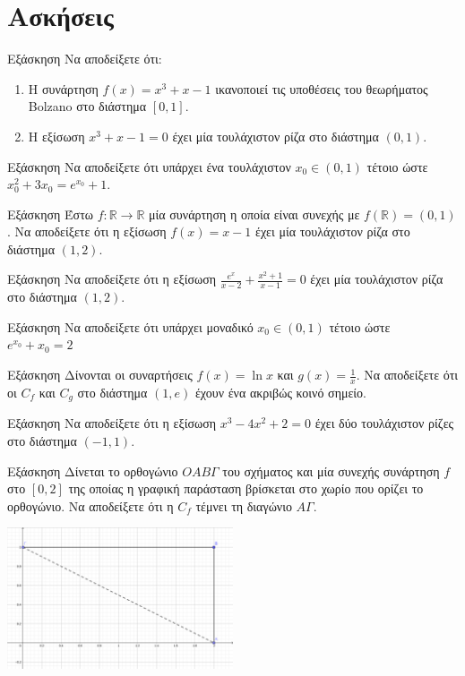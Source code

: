 \documentclass[greek]{beamer}
\begin{document}
\section{Ασκήσεις}
\begin{frame}{Εξάσκηση}
 Να αποδείξετε ότι:
 \begin{enumerate}
  \item Η συνάρτηση $f(x)=x^3+x-1$ ικανοποιεί τις υποθέσεις του θεωρήματος Bolzano στο διάστημα $[0,1]$.\pause
  \item Η εξίσωση $x^3+x-1=0$ έχει μία τουλάχιστον ρίζα στο διάστημα $(0,1)$.
 \end{enumerate}
\end{frame}

\begin{frame}{Εξάσκηση}
 Να αποδείξετε ότι υπάρχει ένα τουλάχιστον $x_0\in (0,1)$ τέτοιο ώστε $x_0^2+3x_0=e^{x_0}+1$.
\end{frame}

\begin{frame}{Εξάσκηση}
 Έστω $f:\mathbb{R}\to\mathbb{R}$ μία συνάρτηση η οποία είναι συνεχής με $f(\mathbb{R})=(0,1)$. Να αποδείξετε ότι η εξίσωση $f(x)=x-1$ έχει μία τουλάχιστον ρίζα στο διάστημα $(1,2)$.
\end{frame}

\begin{frame}{Εξάσκηση}
 Να αποδείξετε ότι η εξίσωση $\frac{e^x}{x-2}+\frac{x^2+1}{x-1}=0$ έχει μία τουλάχιστον ρίζα στο διάστημα $(1,2)$.
\end{frame}

\begin{frame}{Εξάσκηση}
 Να αποδείξετε ότι υπάρχει μοναδικό $x_0\in (0,1)$ τέτοιο ώστε $e^{x_0}+x_0=2$
\end{frame}

\begin{frame}{Εξάσκηση}
 Δίνονται οι συναρτήσεις $f(x)=\ln x$ και $g(x)=\frac{1}{x}$. Να αποδείξετε ότι οι $C_f$ και $C_g$ στο διάστημα $(1,e)$ έχουν ένα ακριβώς κοινό σημείο.
\end{frame}

\begin{frame}{Εξάσκηση}
 Να αποδείξετε ότι η εξίσωση $x^3-4x^2+2=0$ έχει δύο τουλάχιστον ρίζες στο διάστημα $(-1,1)$.
\end{frame}

\begin{frame}{Εξάσκηση}
 Δίνεται το ορθογώνιο $ΟΑΒΓ$ του σχήματος και μία συνεχής συνάρτηση $f$ στο $[0,2]$ της οποίας η γραφική παράσταση βρίσκεται στο χωρίο που ορίζει το ορθογώνιο. Να αποδείξετε ότι η $C_f$ τέμνει τη διαγώνιο $ΑΓ$.


 \centering
 \includegraphics[width=0.5\textwidth]{"images/Bolzano.png"}
\end{frame}
\end{document}
